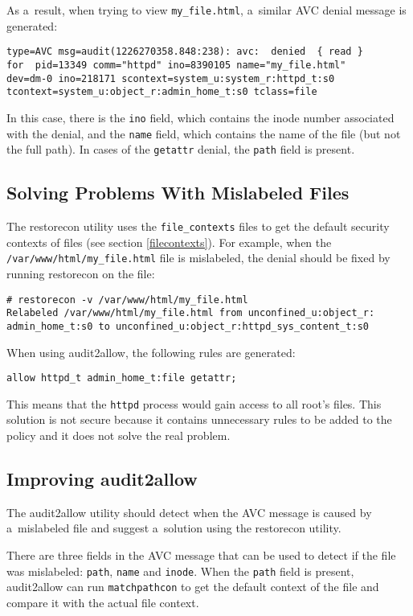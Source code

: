 As a~result, when trying to view \texttt{my\_file.html}, a~similar AVC denial
message is generated:
\begin{lstlisting}
type=AVC msg=audit(1226270358.848:238): avc:  denied  { read }
for  pid=13349 comm="httpd" ino=8390105 name="my_file.html"
dev=dm-0 ino=218171 scontext=system_u:system_r:httpd_t:s0
tcontext=system_u:object_r:admin_home_t:s0 tclass=file
\end{lstlisting}
In this case, there is the \texttt{ino} field, which contains the inode number
associated with the denial, and the \texttt{name} field, which contains the name
of the file (but not the full path). In cases of the \texttt{getattr} denial,
the \texttt{path} field is present.

\subsection{Solving Problems With Mislabeled Files}
The restorecon utility uses the \texttt{file\_contexts} files to get the default
security contexts of files (see section \ref{filecontexts}). For example, when
the \texttt{/var/www/html/my\_file.html} file is mislabeled, the denial should
be fixed by running restorecon on the file:
\begin{lstlisting}
# restorecon -v /var/www/html/my_file.html
Relabeled /var/www/html/my_file.html from unconfined_u:object_r:
admin_home_t:s0 to unconfined_u:object_r:httpd_sys_content_t:s0
\end{lstlisting}

When using audit2allow, the following rules are generated:
\begin{lstlisting}
allow httpd_t admin_home_t:file getattr;
\end{lstlisting}
This means that the \texttt{httpd} process would gain access to all root's
files. This solution is not secure because it contains unnecessary rules to be
added to the policy and it does not solve the real problem.

\subsection{Improving audit2allow}
The audit2allow utility should detect when the AVC message is caused by
a~mislabeled file and suggest a~solution using the restorecon utility.

There are three fields in the AVC message that can be used to detect if the file
was mislabeled: \texttt{path}, \texttt{name} and \texttt{inode}. When the
\texttt{path} field is present, audit2allow can run \texttt{matchpathcon} to get
the default context of the file and compare it with the actual file context.

